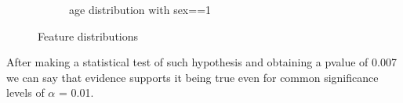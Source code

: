 \documentclass{article}
\begin{document}
\begin{enumerate}[leftmargin=\labelsep]
\begin{figure}[H]
\begin{subfigure}{0.4\linewidth}
        \caption{age distribution with sex==1}
        \label{fig:ca}
    \end{subfigure}
    \caption{Feature distributions}
    \label{fig:distributions}
\end{figure}

After making a statistical test of such hypothesis and obtaining a pvalue of 0.007 we can say that evidence supports it being true even for common significance levels of $\alpha$ = 0.01.


\end{enumerate}

\vskip 1cm

\newpage

\end{document}

